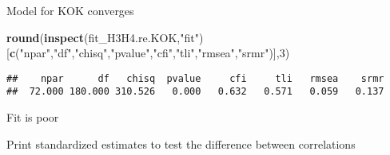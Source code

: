 \documentclass[
]{article}
\newenvironment{Shaded}{\begin{snugshade}}{\end{snugshade}}
\newcommand{\DecValTok}[1]{\textcolor[rgb]{0.00,0.00,0.81}{#1}}
\newcommand{\KeywordTok}[1]{\textcolor[rgb]{0.13,0.29,0.53}{\textbf{#1}}}
\newcommand{\NormalTok}[1]{#1}
\newcommand{\OperatorTok}[1]{\textcolor[rgb]{0.81,0.36,0.00}{\textbf{#1}}}
\newcommand{\StringTok}[1]{\textcolor[rgb]{0.31,0.60,0.02}{#1}}
\begin{document}
Model for KOK converges

\begin{Shaded}
\begin{Highlighting}[]
\KeywordTok{round}\NormalTok{(}\KeywordTok{inspect}\NormalTok{(fit_H3H4.re.KOK,}\StringTok{"fit"}\NormalTok{)}
\NormalTok{      [}\KeywordTok{c}\NormalTok{(}\StringTok{"npar"}\NormalTok{,}\StringTok{"df"}\NormalTok{,}\StringTok{"chisq"}\NormalTok{,}\StringTok{"pvalue"}\NormalTok{,}\StringTok{"cfi"}\NormalTok{,}\StringTok{"tli"}\NormalTok{,}\StringTok{"rmsea"}\NormalTok{,}\StringTok{"srmr"}\NormalTok{)],}\DecValTok{3}\NormalTok{)}
\end{Highlighting}
\end{Shaded}

\begin{verbatim}
##    npar      df   chisq  pvalue     cfi     tli   rmsea    srmr 
##  72.000 180.000 310.526   0.000   0.632   0.571   0.059   0.137
\end{verbatim}

Fit is poor

Print standardized estimates to test the difference between correlations

\begin{Shaded}
\end{Shaded}
\end{document}
